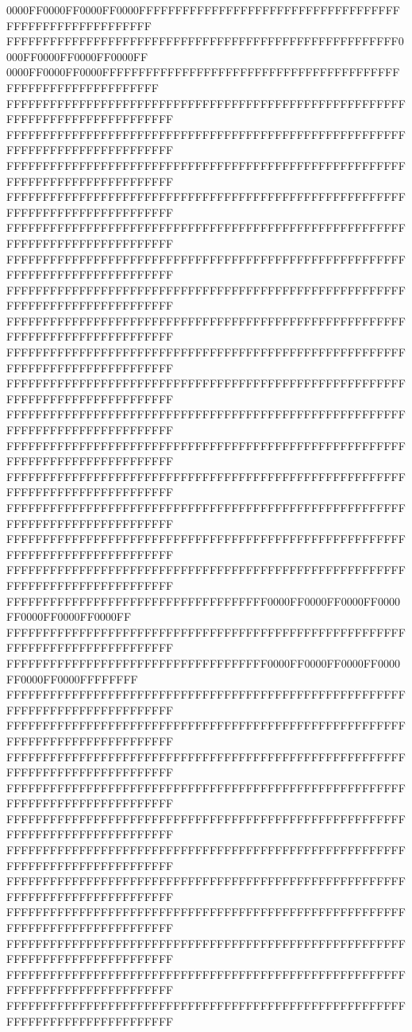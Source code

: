0000FF0000FF0000FF0000FFFFFFFFFFFFFFFFFFFFFFFFFFFFFFFFFFFFFFFFFFFFFFFFFFFFFFFF
FFFFFFFFFFFFFFFFFFFFFFFFFFFFFFFFFFFFFFFFFFFFFFFFFFFFFF0000FF0000FF0000FF0000FF
0000FF0000FF0000FFFFFFFFFFFFFFFFFFFFFFFFFFFFFFFFFFFFFFFFFFFFFFFFFFFFFFFFFFFFFF
FFFFFFFFFFFFFFFFFFFFFFFFFFFFFFFFFFFFFFFFFFFFFFFFFFFFFFFFFFFFFFFFFFFFFFFFFFFFFF
FFFFFFFFFFFFFFFFFFFFFFFFFFFFFFFFFFFFFFFFFFFFFFFFFFFFFFFFFFFFFFFFFFFFFFFFFFFFFF
FFFFFFFFFFFFFFFFFFFFFFFFFFFFFFFFFFFFFFFFFFFFFFFFFFFFFFFFFFFFFFFFFFFFFFFFFFFFFF
FFFFFFFFFFFFFFFFFFFFFFFFFFFFFFFFFFFFFFFFFFFFFFFFFFFFFFFFFFFFFFFFFFFFFFFFFFFFFF
FFFFFFFFFFFFFFFFFFFFFFFFFFFFFFFFFFFFFFFFFFFFFFFFFFFFFFFFFFFFFFFFFFFFFFFFFFFFFF
FFFFFFFFFFFFFFFFFFFFFFFFFFFFFFFFFFFFFFFFFFFFFFFFFFFFFFFFFFFFFFFFFFFFFFFFFFFFFF
FFFFFFFFFFFFFFFFFFFFFFFFFFFFFFFFFFFFFFFFFFFFFFFFFFFFFFFFFFFFFFFFFFFFFFFFFFFFFF
FFFFFFFFFFFFFFFFFFFFFFFFFFFFFFFFFFFFFFFFFFFFFFFFFFFFFFFFFFFFFFFFFFFFFFFFFFFFFF
FFFFFFFFFFFFFFFFFFFFFFFFFFFFFFFFFFFFFFFFFFFFFFFFFFFFFFFFFFFFFFFFFFFFFFFFFFFFFF
FFFFFFFFFFFFFFFFFFFFFFFFFFFFFFFFFFFFFFFFFFFFFFFFFFFFFFFFFFFFFFFFFFFFFFFFFFFFFF
FFFFFFFFFFFFFFFFFFFFFFFFFFFFFFFFFFFFFFFFFFFFFFFFFFFFFFFFFFFFFFFFFFFFFFFFFFFFFF
FFFFFFFFFFFFFFFFFFFFFFFFFFFFFFFFFFFFFFFFFFFFFFFFFFFFFFFFFFFFFFFFFFFFFFFFFFFFFF
FFFFFFFFFFFFFFFFFFFFFFFFFFFFFFFFFFFFFFFFFFFFFFFFFFFFFFFFFFFFFFFFFFFFFFFFFFFFFF
FFFFFFFFFFFFFFFFFFFFFFFFFFFFFFFFFFFFFFFFFFFFFFFFFFFFFFFFFFFFFFFFFFFFFFFFFFFFFF
FFFFFFFFFFFFFFFFFFFFFFFFFFFFFFFFFFFFFFFFFFFFFFFFFFFFFFFFFFFFFFFFFFFFFFFFFFFFFF
FFFFFFFFFFFFFFFFFFFFFFFFFFFFFFFFFFFFFFFFFFFFFFFFFFFFFFFFFFFFFFFFFFFFFFFFFFFFFF
FFFFFFFFFFFFFFFFFFFFFFFFFFFFFFFFFFFF0000FF0000FF0000FF0000FF0000FF0000FF0000FF
FFFFFFFFFFFFFFFFFFFFFFFFFFFFFFFFFFFFFFFFFFFFFFFFFFFFFFFFFFFFFFFFFFFFFFFFFFFFFF
FFFFFFFFFFFFFFFFFFFFFFFFFFFFFFFFFFFF0000FF0000FF0000FF0000FF0000FF0000FFFFFFFF
FFFFFFFFFFFFFFFFFFFFFFFFFFFFFFFFFFFFFFFFFFFFFFFFFFFFFFFFFFFFFFFFFFFFFFFFFFFFFF
FFFFFFFFFFFFFFFFFFFFFFFFFFFFFFFFFFFFFFFFFFFFFFFFFFFFFFFFFFFFFFFFFFFFFFFFFFFFFF
FFFFFFFFFFFFFFFFFFFFFFFFFFFFFFFFFFFFFFFFFFFFFFFFFFFFFFFFFFFFFFFFFFFFFFFFFFFFFF
FFFFFFFFFFFFFFFFFFFFFFFFFFFFFFFFFFFFFFFFFFFFFFFFFFFFFFFFFFFFFFFFFFFFFFFFFFFFFF
FFFFFFFFFFFFFFFFFFFFFFFFFFFFFFFFFFFFFFFFFFFFFFFFFFFFFFFFFFFFFFFFFFFFFFFFFFFFFF
FFFFFFFFFFFFFFFFFFFFFFFFFFFFFFFFFFFFFFFFFFFFFFFFFFFFFFFFFFFFFFFFFFFFFFFFFFFFFF
FFFFFFFFFFFFFFFFFFFFFFFFFFFFFFFFFFFFFFFFFFFFFFFFFFFFFFFFFFFFFFFFFFFFFFFFFFFFFF
FFFFFFFFFFFFFFFFFFFFFFFFFFFFFFFFFFFFFFFFFFFFFFFFFFFFFFFFFFFFFFFFFFFFFFFFFFFFFF
FFFFFFFFFFFFFFFFFFFFFFFFFFFFFFFFFFFFFFFFFFFFFFFFFFFFFFFFFFFFFFFFFFFFFFFFFFFFFF
FFFFFFFFFFFFFFFFFFFFFFFFFFFFFFFFFFFFFFFFFFFFFFFFFFFFFFFFFFFFFFFFFFFFFFFFFFFFFF
FFFFFFFFFFFFFFFFFFFFFFFFFFFFFFFFFFFFFFFFFFFFFFFFFFFFFFFFFFFFFFFFFFFFFFFFFFFFFF
